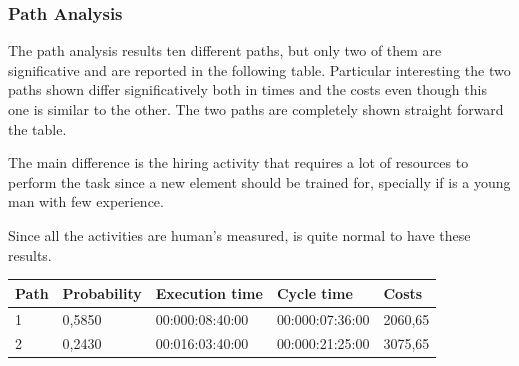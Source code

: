 \subsubsection{Path Analysis}
The path analysis results ten different paths, but only two of them are significative and are reported in the following table. Particular interesting the two paths shown differ significatively both in times and the costs even though this one is similar to the other. The two paths are completely shown straight forward the table.

The main difference is the hiring activity that requires a lot of resources to perform the task since a new element should be trained for, specially if is a young man with few experience.

Since all the activities are human's measured, is quite normal to have these results.

\begin{table}[ht!]
\centering
\begin{tabular}{|l|l|l|l|l|}
\hline
Path&Probability&Execution time&Cycle time&Costs\\
\hline
1&0,5850&00:000:08:40:00&00:000:07:36:00&2060,65\\
\hline
2&0,2430&00:016:03:40:00&00:000:21:25:00&3075,65\\
\hline
\end{tabular}
\end{table}

